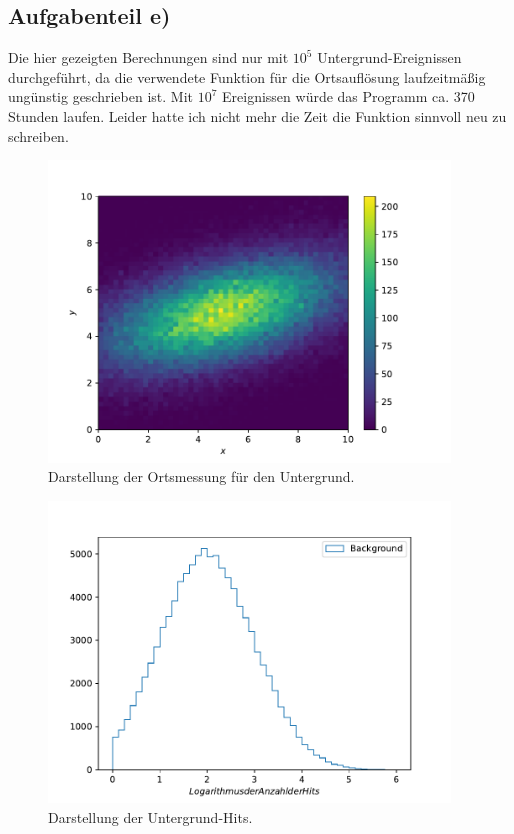 \subsection{Aufgabenteil e)}
Die hier gezeigten Berechnungen sind nur mit $10^5$ Untergrund-Ereignissen durchgeführt,
da die verwendete Funktion für die Ortsauflösung laufzeitmäßig ungünstig geschrieben ist.
Mit $10^7$ Ereignissen würde das Programm ca.
370 Stunden laufen. Leider hatte ich nicht mehr die Zeit die Funktion sinnvoll neu zu schreiben.
\begin{figure}[h]
  \centering
  \includegraphics[height = 8cm]{plots/Ort_BKG.pdf}
  \caption{Darstellung der Ortsmessung für den Untergrund.}
  \label{fig:Ort_BKG}
\end{figure}
\begin{figure}[h]
  \centering
  \includegraphics[height = 8cm]{plots/Hits_BKG.pdf}
  \caption{Darstellung der Untergrund-Hits.}
  \label{fig:Hits_BKG}
\end{figure}
